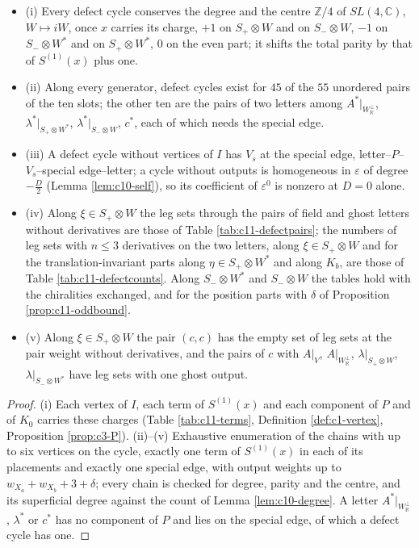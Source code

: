 \begin{proposition}
\label{prop:c11-oddcensus}
\begin{itemize}
\item (i) Every defect cycle conserves the degree and the centre $\mathbb Z/4$ of $SL(4,\mathbb C)$, $W\mapsto iW$, once $x$ carries its charge, $+1$ on $S_+\otimes W$ and on $S_-\otimes W$, $-1$ on $S_-\otimes W^*$ and on $S_+\otimes W^*$, $0$ on the even part; it shifts the total parity by that of $S^{(1)}(x)$ plus one.
\item (ii) Along every generator, defect cycles exist for $45$ of the $55$ unordered pairs of the ten slots; the other ten are the pairs of two letters among $A^*|_{W_{\mathbb R}^\perp}$, $\lambda^*|_{S_+\otimes W^*}$, $\lambda^*|_{S_-\otimes W}$, $c^*$, each of which needs the special edge.
\item (iii) A defect cycle without vertices of $I$ has $V_s$ at the special edge, letter--$P$--$V_s$--special edge--letter; a cycle without outputs is homogeneous in $\varepsilon$ of degree $-\tfrac D2$ (Lemma \ref{lem:c10-self}), so its coefficient of $\varepsilon^0$ is nonzero at $D=0$ alone.
\item (iv) Along $\xi\in S_+\otimes W$ the leg sets through the pairs of field and ghost letters without derivatives are those of Table \ref{tab:c11-defectpairs}; the numbers of leg sets with $n\le3$ derivatives on the two letters, along $\xi\in S_+\otimes W$ and for the translation-invariant parts along $\eta\in S_+\otimes W^*$ and along $K_b$, are those of Table \ref{tab:c11-defectcounts}. Along $S_-\otimes W^*$ and $S_-\otimes W$ the tables hold with the chiralities exchanged, and for the position parts with $\delta$ of Proposition \ref{prop:c11-oddbound}.
\item (v) Along $\xi\in S_+\otimes W$ the pair $(c,c)$ has the empty set of leg sets at the pair weight without derivatives, and the pairs of $c$ with $A|_V$, $A|_{W_{\mathbb R}^\perp}$, $\lambda|_{S_+\otimes W}$, $\lambda|_{S_-\otimes W^*}$ have leg sets with one ghost output.
\end{itemize}
\end{proposition}

\begin{proof}
(i) Each vertex of $I$, each term of $S^{(1)}(x)$ and each component of $P$ and of $K_0$ carries these charges (Table \ref{tab:c11-terms}, Definition \ref{def:c1-vertex}, Proposition \ref{prop:c3-P}). (ii)--(v) Exhaustive enumeration of the chains with up to six vertices on the cycle, exactly one term of $S^{(1)}(x)$ in each of its placements and exactly one special edge, with output weights up to $w_{X_a}+w_{X_b}+3+\delta$; every chain is checked for degree, parity and the centre, and its superficial degree against the count of Lemma \ref{lem:c10-degree}. A letter $A^*|_{W_{\mathbb R}^\perp}$, $\lambda^*$ or $c^*$ has no component of $P$ and lies on the special edge, of which a defect cycle has one.
\end{proof}

